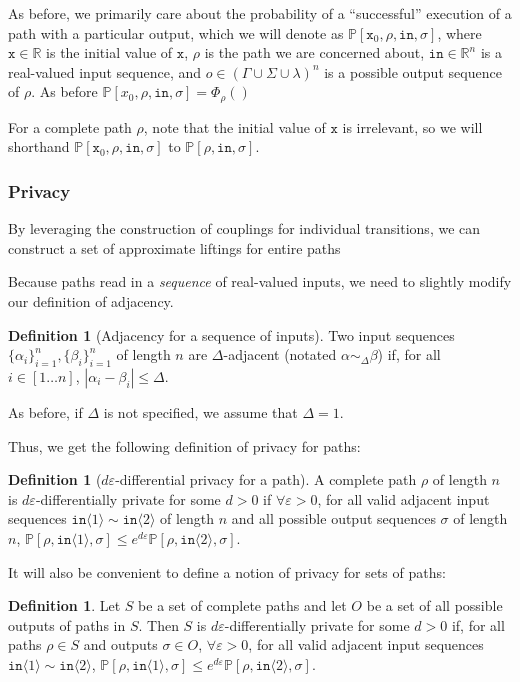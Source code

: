 \documentclass[12pt]{article}
\newcommand{\RR}{\mathbb{R}}
\newcommand{\PP}{\mathbb{P}}
\newcommand{\brangle}[1]{\langle#1 \rangle}
\theoremstyle{definition}
\newtheorem{defn}[thm]{Definition}
\begin{document}
As before, we primarily care about the probability of a ``successful'' execution of a path with a particular output, which we will denote as $\PP[\texttt{x}_0, \rho, \texttt{in}, \sigma]$, where $\texttt{x} \in \RR$ is the initial value of $\texttt{x}$, $\rho$ is the path we are concerned about, $\texttt{in}\in \RR^n$ is a real-valued input sequence, and $o\in (\Gamma\cup\Sigma\cup\lambda)^n$ is a possible output sequence of $\rho$. As before $\PP[x_0, \rho, \texttt{in}, \sigma] = \Phi_\rho()$

For a complete path $\rho$, note that the initial value of $\texttt{x}$ is irrelevant, so we will shorthand $\PP[\texttt{x}_0, \rho, \texttt{in}, \sigma]$ to $\PP[\rho, \texttt{in}, \sigma]$.


\subsubsection{Privacy}

By leveraging the construction of couplings for individual transitions, we can construct a set of approximate liftings for entire paths 

Because paths read in a \textit{sequence} of real-valued inputs, we need to slightly modify our definition of adjacency.

\begin{defn}[Adjacency for a sequence of inputs]
    Two input sequences $\{\alpha_i\}_{i=1}^n, \{\beta_i\}_{i=1}^n$ of length $n$ are $\Delta$-adjacent (notated $\alpha \sim_{\Delta}\beta$) if, for all $i\in [1\ldots n]$, $|\alpha_i-\beta_i|\leq \Delta$. 

    As before, if $\Delta$ is not specified, we assume that $\Delta = 1$. 
\end{defn}

Thus, we get the following definition of privacy for paths:

\begin{defn}[$d\varepsilon$-differential privacy for a path]
    A complete path $\rho$ of length $n$ is $d\varepsilon$-differentially private for some $d>0$ if $\forall \varepsilon>0$, for all valid adjacent input sequences $\texttt{in}\brangle{1}\sim \texttt{in}\brangle{2}$ of length $n$ and all possible output sequences $\sigma$ of length $n$, $\PP[\rho, \texttt{in}\brangle{1}, \sigma]\leq e^{d\varepsilon}\PP[\rho, \texttt{in}\brangle{2}, \sigma]$.
\end{defn}

It will also be convenient to define a notion of privacy for sets of paths:
\begin{defn}
    Let $S$ be a set of complete paths and let $O$ be a set of all possible outputs of paths in $S$. 
    Then $S$ is $d\varepsilon$-differentially private for some $d>0$ if, for all paths $\rho\in S$ and outputs $\sigma\in O$, $\forall \varepsilon>0$, for all valid adjacent input sequences $\texttt{in}\brangle{1}\sim \texttt{in}\brangle{2}$, $\PP[\rho, \texttt{in}\brangle{1}, \sigma]\leq e^{d\varepsilon}\PP[\rho, \texttt{in}\brangle{2}, \sigma]$.
\end{defn}
\end{document}
